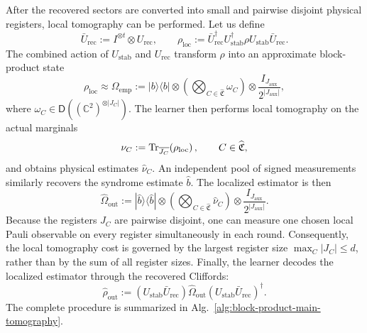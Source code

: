 \documentclass[
  aps,
  prx,
  reprint,
  superscriptaddress,
  amsmath,
  amssymb,
  nofootinbib,
  longbibliography
]{revtex4-2}
\newcommand{\D}{\mathsf{D}}
\begin{document}
After the recovered sectors are converted into small and pairwise disjoint physical registers, local tomography can be performed.
Let us define
\begin{equation}
\bar U_{\mathrm{rec}}
:=
I^{\otimes t}\otimes U_{\mathrm{rec}},
\qquad
\rho_{\mathrm{loc}}
:=
\bar U_{\mathrm{rec}}^\dagger
U_{\mathrm{stab}}^\dagger
\rho
U_{\mathrm{stab}}
\bar U_{\mathrm{rec}}.
\label{eq:mt-computable-localized-state}
\end{equation}
The combined action of $U_{\mathrm{stab}}$ and $U_{\mathrm{rec}}$ transform $\rho$ into an approximate block-product state
\begin{equation}
\rho_{\mathrm{loc}} \approx
\Omega_{\mathrm{emp}}
:=
|b\rangle\!\langle b|
\otimes
\left(
\bigotimes_{C\in\widehat{\mathfrak C}}\omega_C
\right)
\otimes
\frac{I_{J_{\mathrm{aux}}}}{2^{|J_{\mathrm{aux}}|}}, 
\label{eq:mt-localized-emp-block-model}
\end{equation}
where
$\omega_C\in\D\!\left((\mathbb C^2)^{\otimes |J_C|}\right)$.
The learner then performs local tomography on the actual
marginals
\begin{equation}
\nu_C
:=
\Tr_{\overline{J_C}}\!\left(\rho_{\mathrm{loc}}\right),
\qquad
C\in\widehat{\mathfrak C},
\end{equation}
and obtains physical estimates $\widehat\nu_C$. An independent pool of signed
measurements similarly recovers the syndrome estimate $\widehat b$. The
localized estimator is then
\begin{equation}
\widehat\Omega_{\mathrm{out}}
:=
|\widehat b\rangle\!\langle\widehat b|
\otimes
\left(
\bigotimes_{C\in\widehat{\mathfrak C}}
\widehat\nu_C
\right)
\otimes
\frac{I_{J_{\mathrm{aux}}}}{2^{|J_{\mathrm{aux}}|}}.
\end{equation}
Because the registers $J_C$ are pairwise disjoint, one can measure one chosen local Pauli observable on every register
simultaneously in each round. Consequently, the local tomography cost is governed by the
largest register size $\max_C|J_C|\le d$, rather than by the sum of all
register sizes.
Finally, the learner decodes the localized estimator through the recovered
Cliffords:
\begin{equation}
\widehat\rho_{\mathrm{out}}
:=
\left(
U_{\mathrm{stab}}\bar U_{\mathrm{rec}}
\right)
\widehat\Omega_{\mathrm{out}}
\left(
U_{\mathrm{stab}}\bar U_{\mathrm{rec}}
\right)^\dagger.
\end{equation}
The complete procedure is summarized in Alg.~\ref{alg:block-product-main-tomography}.
\end{document}
